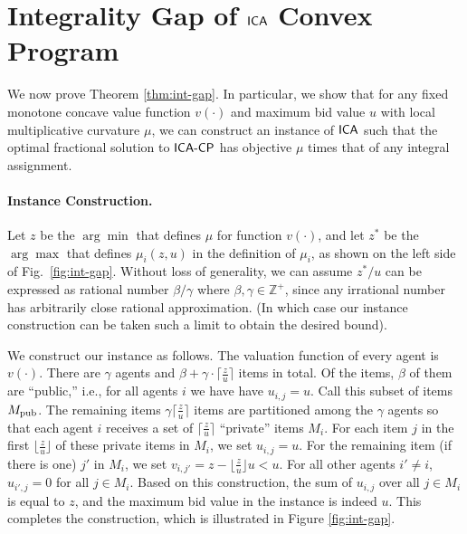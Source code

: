 \section{Integrality Gap of $\mathsf{ICA}$ Convex Program}
\label{sec:int-gap}


We now prove Theorem \ref{thm:int-gap}. In particular, we show that for any fixed monotone concave value function $v(\cdot)$ and maximum bid value $u$ with local multiplicative curvature $\mu$, we can construct an instance of $\mathsf{ICA}$
such that the optimal fractional solution to $\mathsf{ICA\text{-}CP}$ has objective $\mu$ times that of any integral assignment. 


\paragraph{Instance Construction.} Let $z$ be the $\arg\min$
that defines $\mu$ for function  $v(\cdot)$, and let $z^*$ be the $\arg\max$ that defines $\mu_i(z, u)$ in the definition of $\mu_i$, as shown on the left side of Fig.~\ref{fig:int-gap}.
Without loss of generality, we can assume $z^*/u$ can be expressed as 
rational number $\beta/\gamma$ where $\beta, \gamma \in \mathbb{Z}^+$, since any irrational number has arbitrarily close rational  approximation. (In which case our instance construction can be taken such a limit to obtain the desired bound).  




We construct our instance as follows. 
The valuation function of every agent is $v(\cdot)$. 
There are $\gamma$ agents and $\beta + \gamma \cdot \lceil \frac{z}{u} \rceil$ items in total. Of the items, $\beta$ of them are ``public,'' i.e., for all agents $i$ we have have $u_{i,j} = u$. Call this subset of items $M_{\mathrm{pub}}$.  The remaining items $\gamma \lceil\frac{z}{u}\rceil$ items are partitioned among the $\gamma$ agents so that each agent $i$ receives a set of $\lceil\frac{z}{u}\rceil$ ``private'' items $M_i$. For each item $j$ in the first $\lfloor \frac{z}{u}\rfloor$ of these private items in $M_i$, we set $u_{i,j} = u$. 
For the remaining item (if there is one) $j'$ in $M_i$, we set $v_{i,j'} = z - \lfloor \frac{z}{u}\rfloor u < u$.
For all other agents $i' \neq i$, $u_{i',j} = 0$ for all $j \in M_i$. 
Based on this construction, the sum of $u_{i,j}$ over all $j \in M_i$ is equal to $z$, and the maximum bid value in the instance is indeed $u$. 
This completes the construction, which is illustrated in Figure \ref{fig:int-gap}. 


